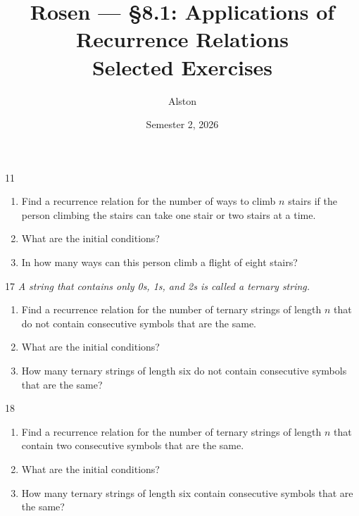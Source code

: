 \documentclass[11pt]{article}
\title{Rosen --- \S 8.1: Applications of Recurrence Relations\\ \large Selected Exercises}
\author{Alston}
\date{Semester 2, 2026}
\begin{document}
\maketitle

\begin{exercise}{11}
    \begin{enumerate}[label=(\alph*)]
        \item Find a recurrence relation for the number of ways to
        climb $n$ stairs if the person climbing the stairs can take
        one stair or two stairs at a time.
        \item What are the initial conditions?
        \item In how many ways can this person climb a flight of
        eight stairs?
    \end{enumerate}
\end{exercise}

\begin{exercise}{17}
    \textit{A string that contains only 0s, 1s, and 2s is called a
    ternary string.}
    \begin{enumerate}[label=(\alph*)]
        \item Find a recurrence relation for the number of ternary
        strings of length $n$ that do not contain consecutive symbols
        that are the same.
        \item What are the initial conditions?
        \item How many ternary strings of length six do not contain
        consecutive symbols that are the same?
    \end{enumerate}
\end{exercise}

\begin{exercise}{18}
    \begin{enumerate}[label=(\alph*)]
        \item Find a recurrence relation for the number of ternary
        strings of length $n$ that contain two consecutive symbols
        that are the same.
        \item What are the initial conditions?
        \item How many ternary strings of length six contain
        consecutive symbols that are the same?
    \end{enumerate}
\end{exercise}
\end{document}
